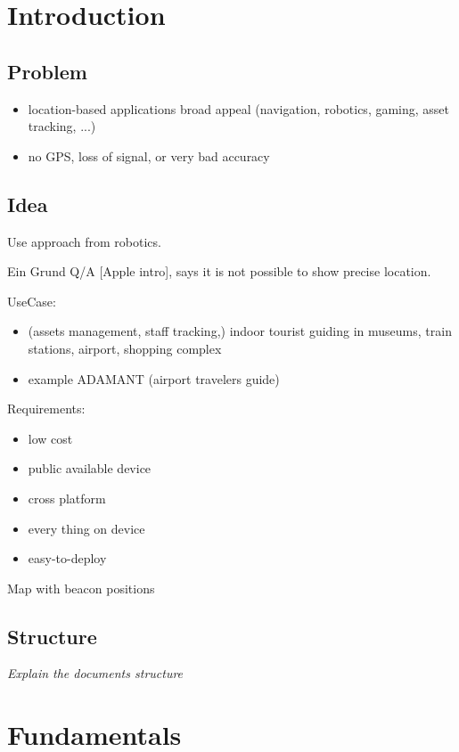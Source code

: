 \chapter{Introduction} \label{chap:intro}

\section{Problem}
\begin{itemize}
\item location-based applications broad appeal (navigation, robotics, gaming, asset tracking, ...)
\item no GPS, loss of signal, or very bad accuracy
\end{itemize}

\section{Idea}

Use approach from robotics.

Ein Grund Q/A [Apple intro], says it is not possible to show precise location.

UseCase:
\begin{itemize}
  \item (assets management, staff tracking,) indoor tourist guiding in museums, train stations, airport, shopping complex \citep{wang:bt_pos}
  \item example ADAMANT (airport travelers guide) \citep{wang:bt_pos}
\end{itemize}

Requirements:
\begin{itemize}
\item low cost
\item public available device
\item cross platform
\item every thing on device \citep{wang:bt_pos}
\item easy-to-deploy \citep{wang:bt_pos}
\end{itemize}

Map with beacon positions

\section{Structure}
\textit{Explain the documents structure}


\chapter{Fundamentals}

